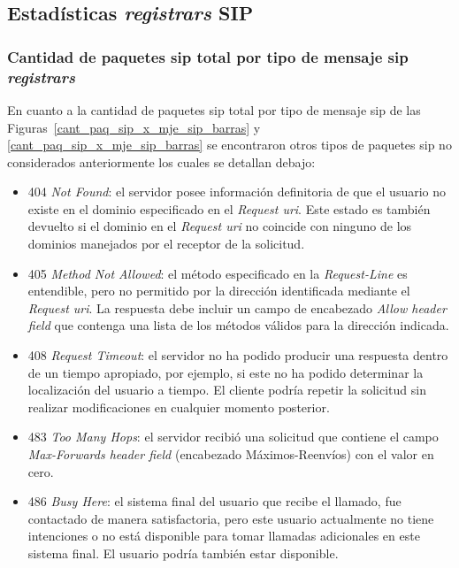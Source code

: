 \documentclass[a4paper,12pt]{report}
\begin{document}
{\subsection{Estadísticas \emph{registrars} SIP}

\subsubsection{Cantidad de paquetes \ac{sip} total por tipo de mensaje \ac{sip} \emph{registrars}}
En cuanto a la cantidad de paquetes \ac{sip} total por tipo de mensaje \ac{sip}
de las Figuras~\ref{cant_paq_sip_x_mje_sip_barras} y \ref{cant_paq_sip_x_mje_sip_barras} 
se encontraron otros tipos de paquetes \ac{sip}
no considerados anteriormente los cuales se detallan debajo:

\begin{itemize}
\item 404 \emph{Not Found}: el servidor posee información definitoria de que el
usuario no existe en el dominio especificado en el \emph{Request \ac{uri}}. Este
estado es también devuelto si el dominio en el \emph{Request \ac{uri}} no coincide
con ninguno de los dominios manejados por el receptor de la solicitud.

\item 405 \emph{Method Not Allowed}: el método especificado en la 
\emph{Request-Line} es entendible, pero no permitido por la
dirección identificada mediante el \emph{Request \ac{uri}}. La respuesta debe
incluir un campo de encabezado \emph{Allow header field} que contenga una lista
de los métodos válidos para la dirección indicada.  

\item 408 \emph{Request Timeout}: el servidor no ha podido producir una respuesta
dentro de un tiempo apropiado, por ejemplo, si este no ha podido determinar la
localización del usuario a tiempo. El cliente podría repetir la solicitud sin
realizar modificaciones en cualquier momento posterior.

\item 483 \emph{Too Many Hops}: el servidor recibió una solicitud que contiene el
campo \emph{Max-Forwards header field} (encabezado Máximos-Reenvíos) con el
valor en cero. 

\item 486 \emph{Busy Here}: el sistema final del usuario que recibe el llamado, fue
contactado de ma\-ne\-ra satisfactoria, pero este usuario actualmente no tiene
intenciones o no está disponible para tomar llamadas adicionales en este
sistema final. El usuario podría también estar disponible.


\end{itemize}}
\end{document}
